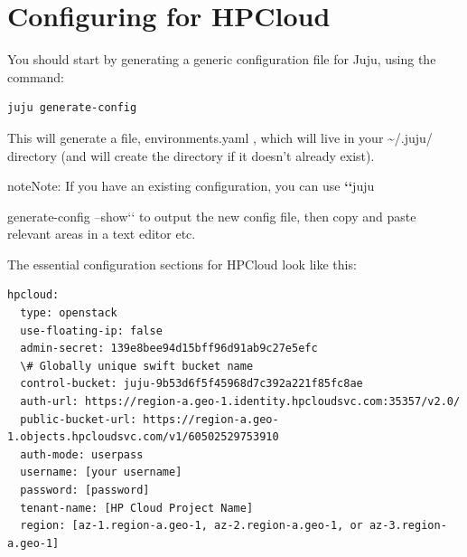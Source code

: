 \documentclass[letterpaper,10pt,english]{sphinxmanual}
\begin{document}
\chapter{Configuring for HPCloud}
\label{config-hpcloud:configuring-for-hpcloud}\label{config-hpcloud::doc}\label{config-hpcloud:videos}
You should start by generating a generic configuration file for Juju,
using the command:

\begin{Verbatim}[commandchars=\\\{\}]
juju generate-config
\end{Verbatim}

This will generate a file, environments.yaml , which will live in your
\textasciitilde{}/.juju/ directory (and will create the directory if it doesn't
already exist).

\begin{notice}{note}{Note:}
If you have an existing configuration, you can use {\color{red}\bfseries{}{}`{}`}juju
\end{notice}

generate-config --show{}`{}` to output the new config file, then copy and
paste relevant areas in a text editor etc.

The essential configuration sections for HPCloud look like this:

\begin{Verbatim}[commandchars=\\\{\}]
hpcloud:
  type: openstack
  use-floating-ip: false
  admin-secret: 139e8bee94d15bff96d91ab9c27e5efc
  \# Globally unique swift bucket name
  control-bucket: juju-9b53d6f5f45968d7c392a221f85fc8ae
  auth-url: https://region-a.geo-1.identity.hpcloudsvc.com:35357/v2.0/
  public-bucket-url: https://region-a.geo-1.objects.hpcloudsvc.com/v1/60502529753910
  auth-mode: userpass
  username: [your username]
  password: [password]
  tenant-name: [HP Cloud Project Name]
  region: [az-1.region-a.geo-1, az-2.region-a.geo-1, or az-3.region-a.geo-1]
\end{Verbatim}
\end{document}

